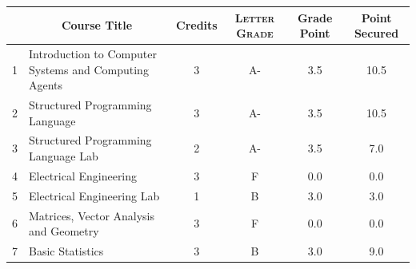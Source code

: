 \documentclass[11pt]{article}
\newcommand*{\numtwo}[1]{\pgfmathprintnumber[
                    fixed, precision=2, fixed zerofill=true]{#1}}
\begin{document}
                \begin{center}
                    \renewcommand{\arraystretch}{1.08}
                    
                \begin{tabular}{|c|l|c|>{\scshape}c|c|c|}
                \hline  \rule[-1ex]{0pt}{3.5ex} {\centering{\bf Course Code}} &  \multicolumn{1}{c|}{\textbf{Course Title}}  & {\bf Credits} & {\bf Letter Grade} & {\bf Grade Point} & {\bf Point Secured}  \\ 
                \hline   1 &  Introduction to Computer Systems and Computing Agents		 & 3 & A- & 3.5 & 10.5 \\ %
                \hline   2 &  Structured Programming Language		 & 3 & A- & 3.5 & 10.5 \\ %
                \hline   3 &  Structured Programming Language Lab		 & 2 & A- & 3.5 & 7.0 \\ %
                \hline   4 &  Electrical Engineering		 & 3 & F & 0.0 & 0.0 \\ %
                \hline   5 &  Electrical Engineering Lab		 & 1 & B & 3.0 & 3.0 \\ %
                \hline   6 &  Matrices, Vector Analysis and Geometry		 & 3 & F & 0.0 & 0.0 \\ %
                \hline   7 &  Basic Statistics		 & 3 & B & 3.0 & 9.0 \\ %

\hline                %
                \end{tabular}
                \end{center}
                \renewcommand{\arraystretch}{1.03}
\end{document}
